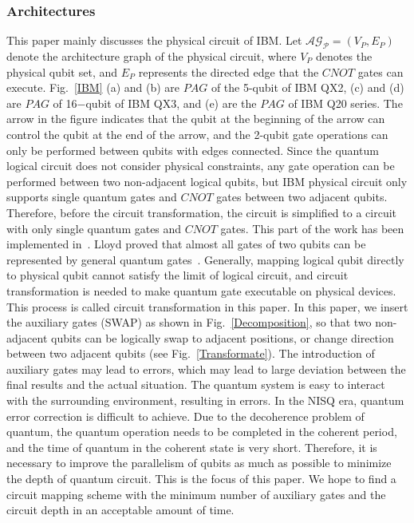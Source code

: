 \documentclass[runningheads]{llncs}
\begin{document}
\subsubsection{Architectures}
This paper mainly discusses the physical circuit of IBM. 
Let $\mathcal{\mathcal{AG}_{P}}=(V_{P},E_{P})$ denote the architecture graph of the physical circuit, 
where $V_{P} $ denotes the physical qubit set, 
and $E_{P}$ represents the directed edge that the $CNOT$ gates can execute.
Fig.~\ref{IBM} (a) and (b) are $PAG$ of the 5-qubit of IBM QX2, 
(c) and (d) are $PAG$ of 16$-$qubit of IBM QX3, 
and (e) are the $PAG$ of IBM Q20 series. 
The arrow in the figure indicates that the qubit at the beginning of the arrow can control 
the qubit at the end of the arrow, and the 2-qubit gate operations can only be performed between 
qubits with edges connected. 
Since the quantum logical circuit does not consider physical constraints, 
any gate operation can be performed between two non-adjacent logical qubits, 
but IBM physical circuit only supports single quantum gates and $CNOT$ gates between two adjacent qubits. 
Therefore, before the circuit transformation, the circuit is simplified to a circuit with only single 
quantum gates and $CNOT$ gates. This part of the work has been implemented in~\cite{2005Mttnen,1995Barenco}. 
Lloyd proved that almost all gates of two qubits can be represented by general quantum gates~\cite{Lloyd1995Almost}. 
Generally, mapping logical qubit directly to physical qubit cannot satisfy the limit of logical circuit, 
and circuit transformation is needed to make quantum gate executable on physical devices. 
This process is called circuit transformation in this paper. In this paper, we insert the 
auxiliary gates (SWAP) as shown in Fig.~\ref{Decomposition},
so that two non-adjacent qubits can be logically swap to adjacent positions, 
or change direction between two adjacent qubits (see Fig.~\ref{Transformate}). 
The introduction of auxiliary gates may lead to errors, 
which may lead to large deviation between the final results and the actual situation. 
The quantum system is easy to interact with the surrounding environment, 
resulting in errors. In the NISQ era, quantum error correction is difficult to achieve. 
Due to the decoherence problem of quantum, the quantum operation needs to be completed in the coherent period, 
and the time of quantum in the coherent state is very short. Therefore, 
it is necessary to improve the parallelism of qubits as much as possible to minimize the depth 
of quantum circuit. This is the focus of this paper. We hope to find a circuit mapping scheme 
with the minimum number of auxiliary gates and the circuit depth in an acceptable amount of time.
\end{document}
